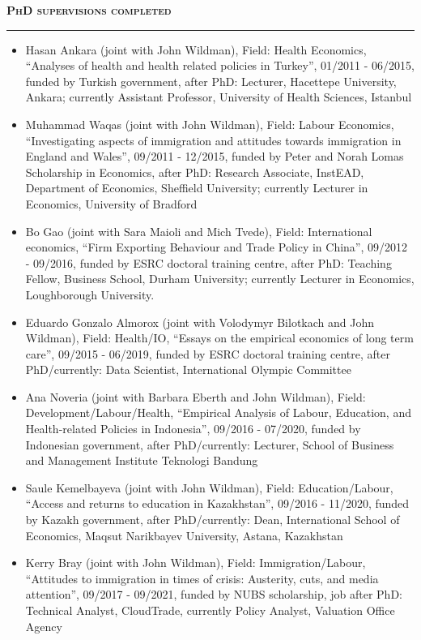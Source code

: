 \documentclass[10pt,pdftex,a4paper,oneside]{article}
\begin{document}
\textbf{\textsc{PhD supervisions completed}}
\vspace{.5ex}
\hrule
\begin{itemize}[noitemsep,nolistsep]
\item Hasan Ankara (joint with John Wildman), Field: Health Economics, ``Analyses of health and health related policies in Turkey'', 01/2011 - 06/2015, funded by Turkish government, after PhD: Lecturer, Hacettepe University, Ankara; currently Assistant Professor,  University of Health Sciences, Istanbul
\item Muhammad Waqas (joint with John Wildman), Field: Labour Economics, ``Investigating aspects of immigration and attitudes towards immigration in England and Wales'', 09/2011 - 12/2015, funded by Peter and Norah Lomas Scholarship in Economics, after PhD: Research Associate, InstEAD, Department of Economics, Sheffield University; currently Lecturer in Economics, University of Bradford
\item Bo Gao (joint with Sara Maioli and Mich Tvede), Field: International economics, ``Firm Exporting Behaviour and Trade Policy in China'', 09/2012 - 09/2016, funded by ESRC doctoral training centre, after PhD: Teaching Fellow, Business School, Durham University; currently Lecturer in Economics, Loughborough University.
\item Eduardo Gonzalo Almorox (joint with Volodymyr Bilotkach and John Wildman), Field: Health/IO, ``Essays on the empirical economics of long term care'', 09/2015 - 06/2019, funded by ESRC doctoral training centre, after PhD/currently: Data Scientist, International Olympic Committee
\item Ana Noveria (joint with Barbara Eberth and John Wildman), Field: Development/Labour/Health, ``Empirical Analysis of Labour, Education, and Health-related Policies in Indonesia'',  09/2016 - 07/2020, funded by Indonesian government, after PhD/currently: Lecturer, School of Business and Management Institute Teknologi Bandung
\item Saule Kemelbayeva (joint with John Wildman), Field: Education/Labour, ``Access and returns to education in Kazakhstan'', 09/2016 - 11/2020, funded by Kazakh government, after PhD/currently: Dean, International School of Economics, Maqsut Narikbayev University, Astana, Kazakhstan
\item Kerry Bray (joint with John Wildman), Field: Immigration/Labour, ``Attitudes to immigration in times of crisis: Austerity, cuts, and media attention'', 09/2017 - 09/2021, funded by NUBS scholarship, job after PhD: Technical Analyst, CloudTrade, currently Policy Analyst, Valuation Office Agency

\end{itemize}
\end{document}
